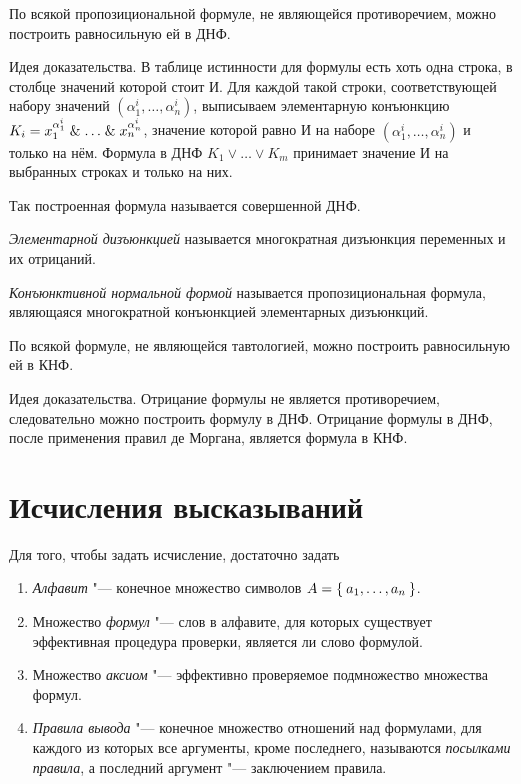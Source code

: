 \begin{theorem}[о ДНФ]
	По всякой пропозициональной формуле, не являющейся противоречием, можно построить равносильную ей в ДНФ.
\end{theorem}

\begin{undefthm}{Идея доказательства.}
	В таблице истинности для формулы есть хоть одна строка, в столбце значений которой стоит И.
	Для каждой такой строки, соответствующей набору значений $ (\alpha_1^i, \dots, \alpha_n^i) $, выписываем элементарную конъюнкцию $ K_i = x_1^{\alpha_1^i} \mathrel\& \dots \mathrel\& x_n^{\alpha_n^i} $, значение которой равно И на наборе $ (\alpha_1^i, \dots, \alpha_n^i) $ и только на нём.
	Формула в ДНФ $ K_1 \vee \dots \vee K_m $ принимает значение И на выбранных строках и только на них.
\end{undefthm}

Так построенная формула называется совершенной ДНФ.

\begin{definition}
	\emph{Элементарной дизъюнкцией} называется многократная дизъюнкция переменных и их отрицаний.
\end{definition}

\begin{definition}
	\emph{Конъюнктивной нормальной формой} называется пропозициональная формула, являющаяся многократной конъюнкцией элементарных дизъюнкций.
\end{definition}

\begin{theorem}[о КНФ]
	По всякой формуле, не являющейся тавтологией, можно построить равносильную ей в КНФ.
\end{theorem}

\begin{undefthm}{Идея доказательства.}
	Отрицание формулы не является противоречием, следовательно можно построить формулу в ДНФ.
	Отрицание формулы в ДНФ, после применения правил де Моргана, является формула в КНФ.
\end{undefthm}

\section{Исчисления высказываний}

Для того, чтобы задать исчисление, достаточно задать
\begin{enumerate}
	\item \emph{Алфавит} "--- конечное множество символов $ A = \Set{a_1, \dots, a_n} $.
	\item Множество \emph{формул} "--- слов в алфавите, для которых существует эффективная процедура проверки, является ли слово формулой.
	\item Множество \emph{аксиом} "--- эффективно проверяемое подмножество множества формул.
	\item \emph{Правила вывода} "--- конечное множество отношений над формулами, для каждого из которых все аргументы, кроме последнего, называются \emph{посылками правила}, а последний аргумент "--- заключением правила.
\end{enumerate}

